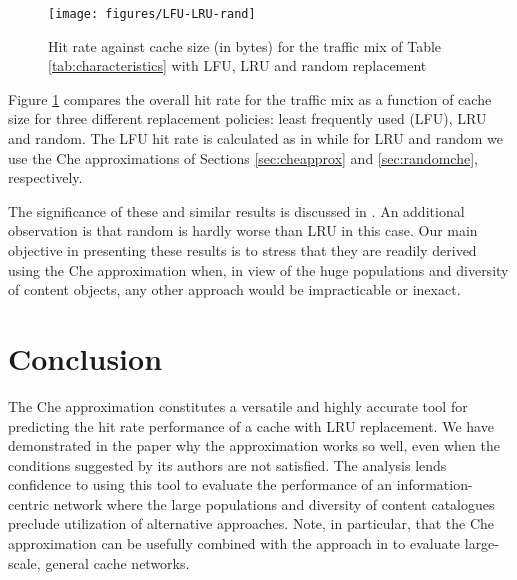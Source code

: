 \documentclass{amsart}
\begin{document}
\begin{figure}
  \centering
\texttt{[image: figures/LFU-LRU-rand]}    
\caption{Hit rate against cache size (in bytes) for the traffic mix of Table \ref{tab:characteristics} with LFU, LRU and random replacement}
 \label{fig:lruvsrand}
 \vspace{-2mm}

\end{figure}

Figure \ref{fig:lruvsrand} compares the overall hit rate for the traffic mix as a function of cache size for three different replacement policies: least frequently used (LFU),  LRU and random. The LFU hit rate is calculated as in \cite{FRRS12} while for LRU and random we use the Che approximations of Sections \ref{sec:cheapprox} and \ref{sec:randomche}, respectively. 

The significance of these and similar results is discussed in \cite{FRRS12}. An additional observation is that random is hardly worse than LRU in this case. Our main objective in presenting these results is to stress that they are readily derived using the Che approximation when, in view of the huge populations and diversity of content objects, any other approach would be impracticable or inexact.


 \section{Conclusion}

The Che approximation constitutes a versatile and highly accurate tool for predicting the hit rate performance of a cache with LRU replacement. We have demonstrated in the paper why the approximation works so well, even when the conditions suggested by its authors are not satisfied. The analysis lends confidence to using this tool to evaluate the performance of an information-centric network where the large populations and diversity of content catalogues preclude utilization of alternative approaches. Note, in particular, that the Che approximation can be usefully combined with the approach in \cite{RKT2010} to evaluate large-scale, general cache networks.
\end{document}
